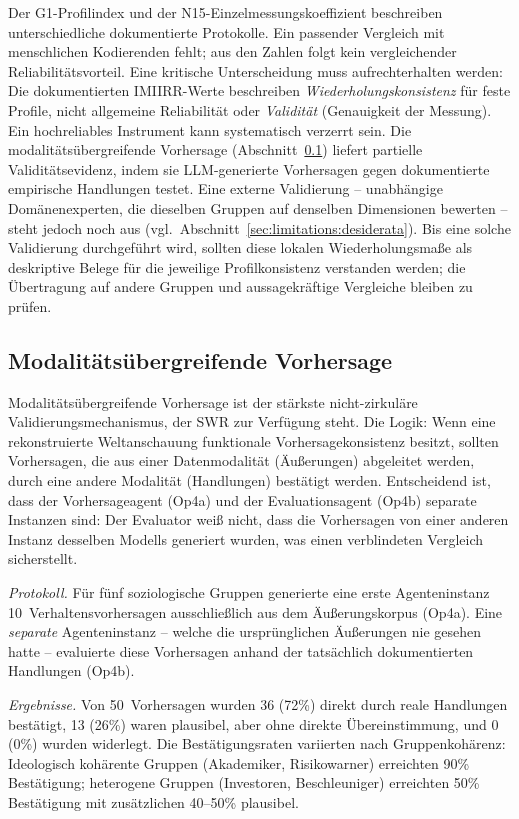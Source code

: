 \documentclass[11pt,a4paper]{article}
\begin{document}
Der G1-Profilindex und der N15-Einzelmessungskoeffizient beschreiben unterschiedliche dokumentierte Protokolle. Ein passender Vergleich mit menschlichen Kodierenden fehlt; aus den Zahlen folgt kein vergleichender Reliabilitätsvorteil. Eine kritische Unterscheidung muss aufrechterhalten werden: Die dokumentierten IMIIRR-Werte beschreiben \emph{Wiederholungskonsistenz} für feste Profile, nicht allgemeine Reliabilität oder \emph{Validität} (Genauigkeit der Messung). Ein hochreliables Instrument kann systematisch verzerrt sein. Die modalitätsübergreifende Vorhersage (Abschnitt~\ref{sec:qa:crossmodal}) liefert partielle Validitätsevidenz, indem sie LLM-generierte Vorhersagen gegen dokumentierte empirische Handlungen testet. Eine externe Validierung -- unabhängige Domänenexperten, die dieselben Gruppen auf denselben Dimensionen bewerten -- steht jedoch noch aus (vgl.\ Abschnitt~\ref{sec:limitations:desiderata}). Bis eine solche Validierung durchgeführt wird, sollten diese lokalen Wiederholungsmaße als deskriptive Belege für die jeweilige Profilkonsistenz verstanden werden; die Übertragung auf andere Gruppen und aussagekräftige Vergleiche bleiben zu prüfen.


\subsection{Modalitätsübergreifende Vorhersage}
\label{sec:qa:crossmodal}

Modalitätsübergreifende Vorhersage ist der stärkste nicht-zirkuläre Validierungsmechanismus, der SWR zur Verfügung steht. Die Logik: Wenn eine rekonstruierte Weltanschauung funktionale Vorhersagekonsistenz besitzt, sollten Vorhersagen, die aus einer Datenmodalität (Äußerungen) abgeleitet werden, durch eine andere Modalität (Handlungen) bestätigt werden. Entscheidend ist, dass der Vorhersageagent (Op4a) und der Evaluationsagent (Op4b) separate Instanzen sind: Der Evaluator weiß nicht, dass die Vorhersagen von einer anderen Instanz desselben Modells generiert wurden, was einen verblindeten Vergleich sicherstellt.

\emph{Protokoll.} Für fünf soziologische Gruppen generierte eine erste Agenteninstanz 10~Verhaltensvorhersagen ausschließlich aus dem Äußerungskorpus (Op4a). Eine \emph{separate} Agenteninstanz -- welche die ursprünglichen Äußerungen nie gesehen hatte -- evaluierte diese Vorhersagen anhand der tatsächlich dokumentierten Handlungen (Op4b).

\emph{Ergebnisse.} Von 50~Vorhersagen wurden 36 (72\%) direkt durch reale Handlungen bestätigt, 13 (26\%) waren plausibel, aber ohne direkte Übereinstimmung, und 0 (0\%) wurden widerlegt. Die Bestätigungsraten variierten nach Gruppenkohärenz: Ideologisch kohärente Gruppen (Akademiker, Risikowarner) erreichten 90\% Bestätigung; heterogene Gruppen (Investoren, Beschleuniger) erreichten 50\% Bestätigung mit zusätzlichen 40--50\% plausibel.
\end{document}
